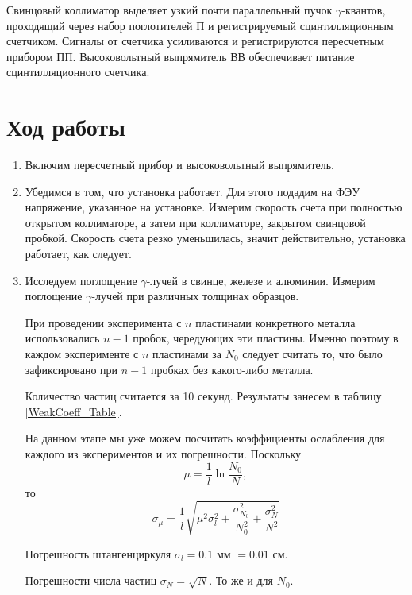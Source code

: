 \documentclass[12pt,a4paper]{article}
\begin{document}
	Свинцовый коллиматор выделяет узкий почти параллельный пучок $\gamma$-квантов, проходящий через набор поглотителей П и регистрируемый сцинтилляционным счетчиком. Сигналы от счетчика усиливаются и регистрируются пересчетным прибором ПП. Высоковольтный выпрямитель ВВ обеспечивает питание сцинтилляционного счетчика.
	
    \section*{Ход работы}

    \begin{enumerate}
		\item Включим пересчетный прибор и высоковольтный выпрямитель.
		
		\item Убедимся в том, что установка работает. Для этого подадим на ФЭУ напряжение, указанное на установке. Измерим скорость счета при полностью открытом коллиматоре, а затем при коллиматоре, закрытом свинцовой пробкой. Скорость счета резко уменьшилась, значит действительно, установка работает, как следует.
		
		\item Исследуем поглощение $\gamma$-лучей в свинце, железе и алюминии. Измерим поглощение $\gamma$-лучей при различных толщинах образцов.
		
		При проведении эксперимента с $n$ пластинами конкретного металла использовались $n-1$ пробок, чередующих эти пластины. Именно поэтому в каждом эксперименте с $n$ пластинами за $N_0$ следует считать то, что было зафиксировано при $n-1$ пробках без какого-либо металла. 
		
		Количество частиц считается за 10 секунд. Результаты занесем в таблицу \ref{WeakCoeff_Table}.
		
		На данном этапе мы уже можем посчитать коэффициенты ослабления для каждого из экспериментов и их погрешности.
		Поскольку
		\begin{equation*}
			\mu = \frac{1}{l}\ln \frac{N_0}{N},
		\end{equation*}
		\noindent то
		\begin{equation*}
			\sigma_\mu = \frac{1}{l}\sqrt{\mu^2 \sigma_l^2 + \frac{\sigma_{N_0}^2}{N_0^2} + \frac{\sigma_N^2}{N^2}}
		\end{equation*}
	
		Погрешность штангенциркуля $\sigma_l = 0.1$ мм $= 0.01$ см.
		
		Погрешности числа частиц $\sigma_N = \sqrt{N}$. То же и для $N_0$.
		

\end{enumerate}
\end{document}
